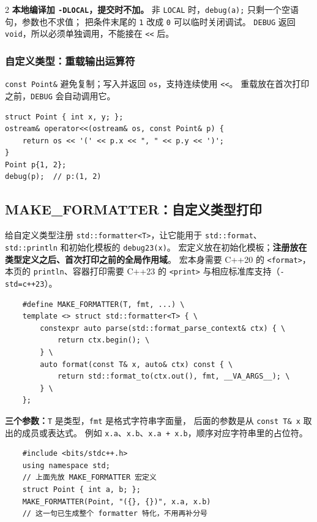 \begin{multicols*}{2}
	\textbf{本地编译加 \texttt{-DLOCAL}，提交时不加。}
	非 \texttt{LOCAL} 时，\texttt{debug(a);} 只剩一个空语句，参数也不求值；
	把条件末尾的 \texttt{1} 改成 \texttt{0} 可以临时关闭调试。
	\texttt{DEBUG} 返回 \texttt{void}，所以必须单独调用，不能接在 \texttt{<<} 后。

	\subsubsection{自定义类型：重载输出运算符}

	\texttt{const Point\&} 避免复制；写入并返回 \texttt{os}，支持连续使用 \texttt{<<}。
	重载放在首次打印之前，\texttt{DEBUG} 会自动调用它。

	\begin{verbatim}
struct Point { int x, y; };
ostream& operator<<(ostream& os, const Point& p) {
    return os << '(' << p.x << ", " << p.y << ')';
}
Point p{1, 2};
debug(p);  // p:(1, 2)
	\end{verbatim}

	\subsection{MAKE\_FORMATTER：自定义类型打印}
	
	给自定义类型注册 \texttt{std::formatter<T>}，让它能用于
	\texttt{std::format}、\texttt{std::println} 和初始化模板的 \texttt{debug23(x)}。
	宏定义放在初始化模板；\textbf{注册放在类型定义之后、首次打印之前的全局作用域}。
	宏本身需要 C++20 的 \texttt{<format>}，本页的 \texttt{println}、容器打印需要
	C++23 的 \texttt{<print>} 与相应标准库支持（\texttt{-std=c++23}）。
	
	\begin{verbatim}
	#define MAKE_FORMATTER(T, fmt, ...) \
	template <> struct std::formatter<T> { \
	    constexpr auto parse(std::format_parse_context& ctx) { \
	        return ctx.begin(); \
	    } \
	    auto format(const T& x, auto& ctx) const { \
	        return std::format_to(ctx.out(), fmt, __VA_ARGS__); \
	    } \
	};
	\end{verbatim}
	
	\textbf{三个参数：}\texttt{T} 是类型，\texttt{fmt} 是格式字符串字面量，
	后面的参数是从 \texttt{const T\& x} 取出的成员或表达式。
	例如 \texttt{x.a}、\texttt{x.b}、\texttt{x.a + x.b}，顺序对应字符串里的占位符。
	
	\begin{verbatim}
	#include <bits/stdc++.h>
	using namespace std;
	// 上面先放 MAKE_FORMATTER 宏定义
	struct Point { int a, b; };
	MAKE_FORMATTER(Point, "({}, {})", x.a, x.b)
	// 这一句已生成整个 formatter 特化，不用再补分号
	

\end{verbatim}
\end{multicols*}
